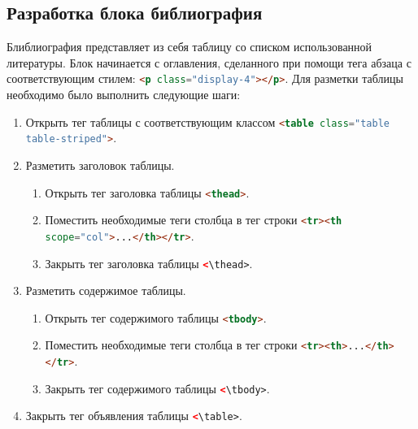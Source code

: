 \subsection{Разработка блока библиография}
Блиблиография представляет из себя таблицу со списком использованной литературы. Блок начинается с оглавления, сделанного при помощи тега абзаца с соответствующим стилем: \lstinline[language=HTML]{<p class="display-4"></p>}. Для разметки таблицы необходимо было выполнить следующие шаги:

\begin{enumerate}
	\item Открыть тег таблицы с соответствующим классом \lstinline[language=HTML]{<table class="table table-striped">}.
	\item Разметить заголовок таблицы.
	\begin{enumerate}
		\item Открыть тег заголовка таблицы \lstinline[language=HTML]{<thead>}.
		\item Поместить необходимые теги столбца в тег строки \lstinline[language=HTML]{<tr><th scope="col">...</th></tr>}.
		\item Закрыть тег заголовка таблицы \lstinline[language=HTML]{<\thead>}.
	\end{enumerate}
	\item Разметить содержимое таблицы.
	\begin{enumerate}
		\item Открыть тег содержимого таблицы \lstinline[language=HTML]{<tbody>}.
		\item Поместить необходимые теги столбца в тег строки \lstinline[language=HTML]{<tr><th>...</th></tr>}.
		\item Закрыть тег содержимого таблицы \lstinline[language=HTML]{<\tbody>}.
	\end{enumerate}
	\item Закрыть тег объявления таблицы \lstinline[language=HTML]{<\table>}.
\end{enumerate}